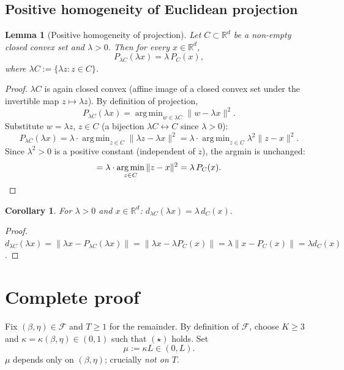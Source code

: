 \documentclass[11pt]{article}
\newtheorem{lemma}[theorem]{Lemma}
\newtheorem{corollary}[theorem]{Corollary}
\theoremstyle{definition}
\theoremstyle{remark}
\DeclareMathOperator*{\argmin}{arg\,min}
\begin{document}
\subsection{Positive homogeneity of Euclidean projection}

\begin{lemma}[Positive homogeneity of projection]
\label{lem:pos-hom}
Let $C \subset \mathbb{R}^d$ be a non-empty closed convex set and $\lambda > 0$. Then for every $x \in \mathbb{R}^d$,
\[
  P_{\lambda C}(\lambda x) = \lambda\, P_C(x),
\]
where $\lambda C := \{\lambda z : z \in C\}$.
\end{lemma}

\begin{proof}
$\lambda C$ is again closed convex (affine image of a closed convex set under the invertible map $z \mapsto \lambda z$). By definition of projection,
\[
  P_{\lambda C}(\lambda x) = \argmin_{w \in \lambda C} \|w - \lambda x\|^2.
\]
Substitute $w = \lambda z$, $z \in C$ (a bijection $\lambda C \leftrightarrow C$ since $\lambda > 0$):
\[
  P_{\lambda C}(\lambda x) = \lambda \cdot \argmin_{z \in C} \|\lambda z - \lambda x\|^2 = \lambda \cdot \argmin_{z \in C} \lambda^2 \|z - x\|^2.
\]
Since $\lambda^2 > 0$ is a positive constant (independent of $z$), the argmin is unchanged:
\[
  = \lambda \cdot \argmin_{z \in C} \|z - x\|^2 = \lambda\, P_C(x). \qedhere
\]
\end{proof}

\begin{corollary}
\label{cor:pos-hom-dist}
For $\lambda > 0$ and $x \in \mathbb{R}^d$: $d_{\lambda C}(\lambda x) = \lambda\, d_C(x)$.
\end{corollary}

\begin{proof}
$d_{\lambda C}(\lambda x) = \|\lambda x - P_{\lambda C}(\lambda x)\| = \|\lambda x - \lambda P_C(x)\| = \lambda \|x - P_C(x)\| = \lambda d_C(x)$.
\end{proof}

\section{Complete proof}
\label{sec:complete-proof}

Fix $(\beta, \eta) \in \mathcal{F}$ and $T \geq 1$ for the remainder. By definition of $\mathcal{F}$, choose $K \geq 3$ and $\kappa = \kappa(\beta,\eta) \in (0,1)$ such that $(\star)$ holds. Set
\begin{equation}
  \mu := \kappa L \in (0, L).\tag{MU}
\end{equation}
$\mu$ depends only on $(\beta, \eta)$; crucially \emph{not on $T$}.
\end{document}

